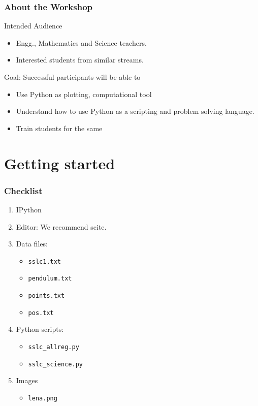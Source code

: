\documentclass[14pt,compress]{beamer}
\newcommand{\typ}[1]{\lstinline{#1}}
\begin{document}
\begin{frame}
  \frametitle{About the Workshop}
  \begin{block}{Intended Audience}
  \begin{itemize}
       \item Engg., Mathematics and Science teachers.
       \item Interested students from similar streams.
  \end{itemize}
  \end{block}  

  \begin{block}{Goal: Successful participants will be able to}
    \begin{itemize}
      \item Use Python as plotting, computational tool
      \item Understand how to use Python as a scripting and problem solving language.
      \item Train students for the same
    \end{itemize}
  \end{block}
\end{frame}

\section{Getting started}
\begin{frame}
\frametitle{Checklist}
  \begin{enumerate}
    \item IPython
    \item Editor: We recommend scite.
    \item Data files: 
      \begin{itemize}
      \item \typ{sslc1.txt}
      \item \typ{pendulum.txt}
      \item \typ{points.txt}
      \item \typ{pos.txt}
      \end{itemize}
    \item Python scripts: 
      \begin{itemize}
      \item \typ{sslc_allreg.py}
      \item \typ{sslc_science.py}
      \end{itemize}
    \item Images
      \begin{itemize}
      \item \typ{lena.png}
      \end{itemize}
  \end{enumerate}
\end{frame}
\end{document}
